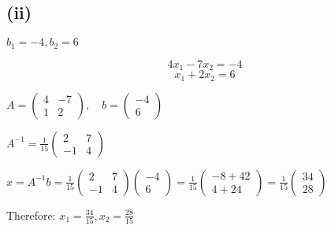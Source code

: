 \subsection*{(ii)} $b_1 = -4, b_2 = 6$

\[
	4x_1 - 7x_2 = -4
\]
\[
	x_1 + 2x_2 = 6
\]

$A = \begin{pmatrix}
	4 & -7 \\
	1 & 2
\end{pmatrix}, \quad b = \begin{pmatrix}
	-4 \\
	6
\end{pmatrix}$

$A^{-1} = \frac{1}{15}\begin{pmatrix}
	2 & 7 \\
	-1 & 4
\end{pmatrix}$

$x = A^{-1}b = \frac{1}{15}\begin{pmatrix}
	2 & 7 \\
	-1 & 4
\end{pmatrix}\begin{pmatrix}
	-4 \\
	6
\end{pmatrix} = \frac{1}{15}\begin{pmatrix}
	-8 + 42 \\
	4 + 24
\end{pmatrix} = \frac{1}{15}\begin{pmatrix}
	34 \\
	28
\end{pmatrix}$

Therefore: $x_1 = \frac{34}{15}, x_2 = \frac{28}{15}$